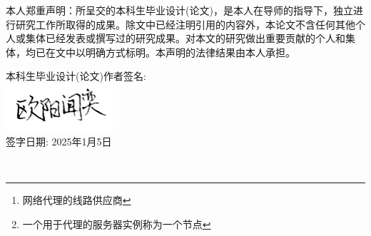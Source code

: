 \documentclass[12pt,a4paper]{article}%
\begin{document}
\setlength{\parindent}{2em} %
\setlength{\parskip}{2em}  %
{\fangsong %
本人郑重声明：所呈交的本科生毕业设计(论文)，是本人在导师的指导下，独立进行研究工作所取得的成果。除文中已经注明引用的内容外，本论文不含任何其他个人或集体已经发表或撰写过的研究成果。对本文的研究做出重要贡献的个人和集体，均已在文中以明确方式标明。本声明的法律结果由本人承担。

\begin{flushright} %
本科生毕业设计(论文)作者签名:\\
\vspace{1em} %
\includegraphics[width=4cm]{img/owalabuy_sign.png} \\ %
签字日期: 2025年1月5日
\end{flushright}}

\newpage

\fancyhf{} %

\begin{abstract}
	\fangsong
    网络代理是我们常用的反审查手段 目前主流的内核有xray-core v2ray-core sing-box hysteria2 clash等等 它们需要用户手动编写配置文件 较为麻烦且对用户的技术水平要求较高 所以代理线路管理软件出现了 在Windows平台和Android平台上有一些GUI客户端 如V2RayN/G Clash系 Surfboard 它们都是基于图形界面的 支持对机场\footnote{网络代理的线路供应商}的订阅链接进行解析 获取到链接中的节点\footnote{一个用于代理的服务器实例称为一个节点}信息 用户还可以手动添加节点 用户直接在GUI客户端中选择节点 进行连接
\end{abstract}

\begin{adjustwidth}{1.06cm}{1.06cm}
    \fontsize{10.5pt}{15.75pt}\\
\end{adjustwidth}
\end{document}
